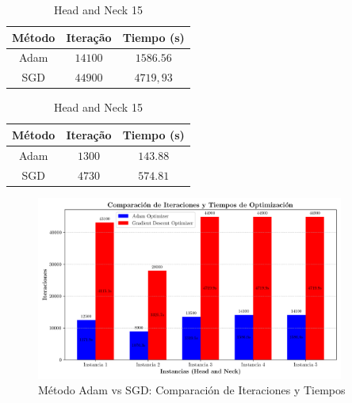 \documentclass[a4paper,12pt]{article}
\begin{document}
\vspace{-0.5cm}
\begin{table}[!ht]
    \centering
    \caption{Head and Neck 15}
    \begin{minipage}[t]{0.45\textwidth}
        \centering
        \label{tab:tab1}
        \begin{tabular}{ccc}
            \hline
            Método & Iteração & Tiempo (s)\\
            \hline
            Adam & $14100$ &  $1586.56$ \\
            SGD & $44900$ & $4719,93$ \\
            \hline
        \end{tabular}
    \end{minipage}
    \hfill
    \begin{minipage}[t]{0.45\textwidth}
        \centering
        \label{tab:tab2}
        \begin{tabular}{ccc}
            \hline
            Método & Iteração & Tiempo (s) \\
            \hline
            Adam & $1300$ &   $143.88$  \\
            SGD &  $4730$ & $574.81$ \\
            \hline
        \end{tabular}
    \end{minipage}
\end{table}

\begin{figure}[!ht]
    \centering
    \includegraphics[width=0.9\textwidth]{../Graficos/comparacion_metodos.png}
    \caption{Método Adam vs SGD: Comparación de Iteraciones y Tiempos}
    \label{fig:exemplo}
\end{figure}
\end{document}
